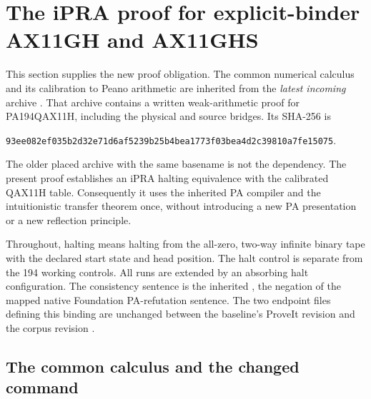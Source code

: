 \section{The iPRA proof for explicit-binder AX11GH and AX11GHS}
\label{sec:new-relative-ipra}

This section supplies the new proof obligation.  The common numerical
calculus and its calibration to Peano arithmetic are inherited from the
\emph{latest incoming} archive
.  That archive contains a written
weak-arithmetic proof for PA194QAX11H, including the physical and source
bridges.  Its SHA-256 is
\begin{center}\small
\nolinkurl{93ee082ef035b2d32e71d6af5239b25b4bea1773f03bea4d2c39810a7fe15075}.
\end{center}
The older placed archive with the same basename is not the dependency.
The present proof establishes an iPRA halting equivalence with the
calibrated QAX11H table.  Consequently it uses the inherited PA compiler
and the intuitionistic transfer theorem once, without introducing a new
PA presentation or a new reflection principle.

Throughout, halting means halting from the all-zero, two-way infinite
binary tape with the declared start state and head position.  The halt
control is separate from the 194 working controls.  All runs are extended
by an absorbing halt configuration.  The consistency sentence is the
inherited , the negation of the mapped native
Foundation PA-refutation sentence.  The two endpoint files defining this
binding are unchanged between the baseline's ProveIt revision
 and the corpus revision
.

\subsection{The common calculus and the changed command}

